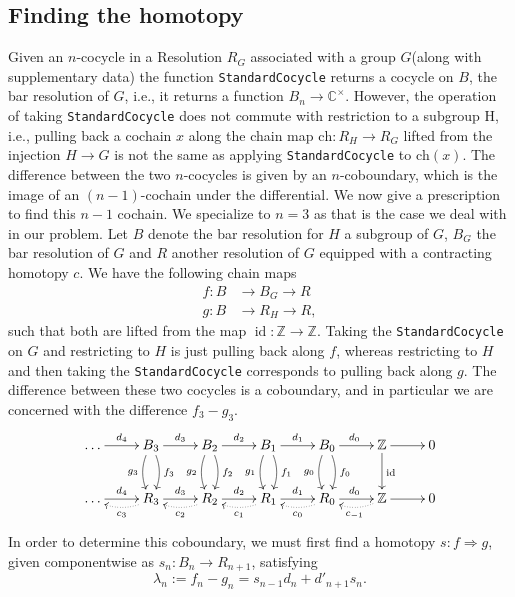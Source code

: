 \documentclass[11pt]{book}
\theoremstyle{Rem}
\theoremstyle{definition}
\numberwithin{equation}{section}
\newcommand\lstl{\lstinline}
\newcommand\id{\operatorname{id}}
\newcommand\CC{\mathbb C}
\newcommand\ZZ{\mathbb Z}
\newcommand{\ra}\rightarrow
\begin{document}
\subsection{Finding the homotopy}
Given an $n$-cocycle in a Resolution $R_G$ associated with a group $G$(along with supplementary data) the function \lstl{StandardCocycle} returns a cocycle on $B$, the bar resolution of $G$, i.e., it returns a function $B_n\ra \CC^\times$. However, the operation of taking \lstl{StandardCocycle} does not commute with restriction to a subgroup H, i.e., pulling back a cochain $x$ along the chain map $\text{ch}: R_H\ra R_G$ lifted from the injection $H\ra G$ is not the same as applying \lstl{StandardCocycle} to $\text{ch}(x)$. The difference between the two $n$-cocycles is given by an $n$-coboundary, which is the image of an $(n-1)$-cochain under the differential. We now give a prescription to find this $n-1$ cochain. We specialize to $n=3$ as that is the case we deal with in our problem.
Let $B$ denote the bar resolution for $H$ a subgroup of $G$, $B_G$ the bar resolution of $G$ and $R$ another resolution of $G$ equipped with a contracting homotopy $c$. We have the following chain maps \begin{align}
	f:B &\ra B_G \ra R \\
	g: B &\ra R_H \ra R,
\end{align} 
such that both are lifted from the map $\id: \ZZ \ra \ZZ$. Taking the \lstl{StandardCocycle} on $G$ and restricting to $H$ is just pulling back along $f$, whereas restricting to $H$ and then taking the \lstl{StandardCocycle} corresponds to pulling back along $g$. The difference between these two cocycles is a coboundary, and in particular we are concerned with the difference $f_3 - g_3$.
\[
\xymatrix{ \dots \ar[r]^{d_4}  & B_3 \ar[r]^{d_3} \ar@/^/[d]^{f_3}\ar@/_/[d]_{g_3} & B_2 \ar[r]^{d_2}\ar@/^/[d]^{f_2}\ar@/_/[d]_{g_2} & \ar[r]^{d_1} B_1 \ar@/^/[d]^{f_1}\ar@/_/[d]_{g_1} & \ar[r]^{d_0} B_0 \ar@/^/[d]^{f_0}\ar@/_/[d]_{g_0} & \ZZ\ar[r] \ar[d]^{\id}&  0 \\
 \dots \ar[r]^{d_4} & R_3 \ar[r]^{d_3} \ar@{.>}@/^/[l]^{c_3} & R_2 \ar[r]^{d_2} \ar@{.>}@/^/[l]^{c_2}& R_1 \ar[r]^{d_1} \ar@{.>}@/^/[l]^{c_1} & R_0 \ar[r]^{d_0}  \ar@{.>}@/^/[l]^{c_0}& \ZZ \ar[r] \ar@{.>}@/^/[l]^{c_{-1}}& 0
}
\]
In order to determine this coboundary, we must first find a homotopy $s: f\Rightarrow g$, given componentwise as $s_n:B_n \ra R_{n+1}$, satisfying \begin{equation}
	\lambda_{n}:= f_{n}-g_{n} = s_{n-1}d_{n} + d'_{n+1}s_{n}.
\end{equation} 
\end{document}
